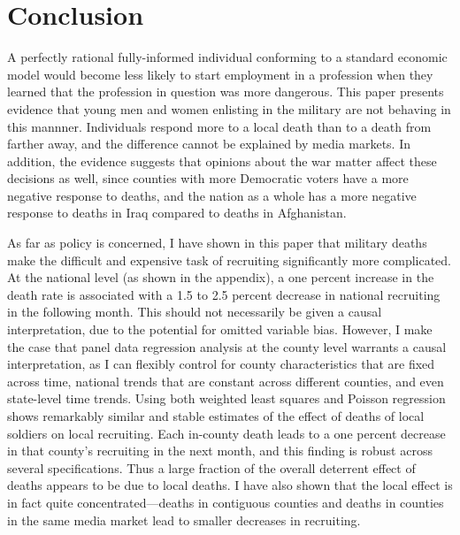 \documentclass[12pt] {article}
\begin{document}
\section{Conclusion}\label{sec:Conclusion}


A perfectly rational fully-informed individual conforming to a standard economic model would become less likely to start employment in a profession when they learned that the profession in question was more dangerous. This paper presents evidence that young men and women enlisting in the military are not behaving in this mannner. Individuals respond more to a local death than to a death from farther away, and the difference cannot be explained by media markets. In addition, the evidence suggests that opinions about the war matter affect these decisions as well, since counties with more Democratic voters have a more negative response to deaths, and the nation as a whole has a more negative response to deaths in Iraq compared to deaths in Afghanistan. 

  As far as policy is concerned, I have shown in this paper that military deaths make the difficult and expensive task of recruiting significantly
more complicated. At the national level (as shown in the appendix), a one percent increase in
the death rate is associated with a 1.5 to 2.5 percent decrease in
national recruiting in the following month. This should not necessarily
be given a causal interpretation, due to the potential for omitted
variable bias. However, I make the case that panel data regression
analysis at the county level warrants a causal interpretation, as
I can flexibly control for county characteristics that are fixed across
time, national trends that are constant across different counties,
and even state-level time trends. Using both weighted least squares
and Poisson regression shows remarkably similar and stable estimates
of the effect of deaths of local soldiers on local recruiting. Each
in-county death leads to a one percent decrease in that county's recruiting
in the next month, and this finding is robust across several specifications.
Thus a large fraction of the overall deterrent effect of deaths appears
to be due to local deaths. I have also shown that the local effect
is in fact quite concentrated---deaths in contiguous counties and
deaths in counties in the same media market lead to smaller decreases in recruiting.
\end{document}
